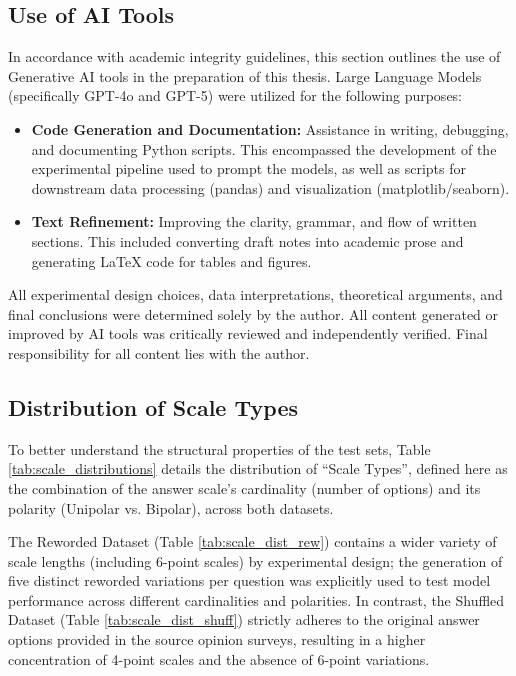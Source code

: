 \subsection{Use of AI Tools}
In accordance with academic integrity guidelines, this section outlines the use of Generative AI tools in the preparation of this thesis. Large Language Models (specifically GPT-4o and GPT-5) were utilized for the following purposes:

\begin{itemize}
    \item \textbf{Code Generation and Documentation:} Assistance in writing, debugging, and documenting Python scripts. This encompassed the development of the experimental pipeline used to prompt the models, as well as scripts for downstream data processing (pandas) and visualization (matplotlib/seaborn).
    \item \textbf{Text Refinement:} Improving the clarity, grammar, and flow of written sections. This included converting draft notes into academic prose and generating LaTeX code for tables and figures.
\end{itemize}

All experimental design choices, data interpretations, theoretical arguments, and final conclusions were determined solely by the author. All content generated or improved by AI tools was critically reviewed and independently verified. Final responsibility for all content lies with the author.


\subsection{Distribution of Scale Types}
\label{app:scale_distribution}

To better understand the structural properties of the test sets, Table \ref{tab:scale_distributions} details the distribution of ``Scale Types'', defined here as the combination of the answer scale's cardinality (number of options) and its polarity (Unipolar vs. Bipolar), across both datasets.

The Reworded Dataset (Table \ref{tab:scale_dist_rew}) contains a wider variety of scale lengths (including 6-point scales) by experimental design; the generation of five distinct reworded variations per question was explicitly used to test model performance across different cardinalities and polarities. In contrast, the Shuffled Dataset (Table \ref{tab:scale_dist_shuff}) strictly adheres to the original answer options provided in the source opinion surveys, resulting in a higher concentration of 4-point scales and the absence of 6-point variations.

